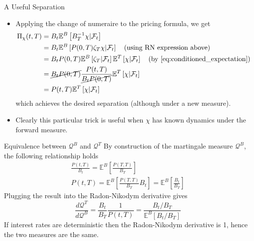 \documentclass{beamer}
\begin{document}
\begin{frame}{A Useful Separation}
	\begin{itemize}
		\item Applying the change of numeraire to the pricing formula, we get
		\begin{equation*}
			\begin{aligned}
			\Pi_\chi(t,T) & = B_t\mathbb{E}^B\left[B^{-1}_T\chi|\mathcal{F}_t\right] \\
			& = B_t\mathbb{E}^B\left[P(0,T)\zeta_T\chi|\mathcal{F}_t\right]\quad\text{(using RN expression above)}\\
			& = B_tP(0,T)\mathbb{E}^B\left[\zeta_T|\mathcal{F}_t\right]\mathbb{E}^T\left[\chi|\mathcal{F}_t\right]\quad\text{(by \cref{eq:conditioned_expectation})}\\
			& = \cancel{B_tP(0,T)}\frac{P(t,T)}{\cancel{B_tP(0,T)}}\mathbb{E}^T\left[\chi|\mathcal{F}_t\right] \\
			& = P(t,T)\mathbb{E}^T\left[\chi|\mathcal{F}_t\right] \\
			\end{aligned}
		\end{equation*}
		which achieves the desired separation (although under a new measure).
		\item Clearly this particular trick is useful when $\chi$ has known dynamics under the forward measure.
	\end{itemize}
\end{frame}

\begin{frame}{Equivalence between $\mathcal{Q}^B$ and $\mathcal{Q}^T$}
By construction of the martingale measure $\mathcal{Q}^B$, the following relationship holds
\begin{equation*}
\begin{gathered}
\frac{P(t,T)}{B_t}=\mathbb{E}^B\left[\frac{P(T,T)}{B_T}\right]\\[0.3cm]
P(t,T)=\mathbb{E}^B\left[\frac{P(T,T)}{B_T}B_t\right] = \mathbb{E}^B\left[\frac{B_t}{B_T}\right]
\end{gathered}
\end{equation*}
Plugging the result into the Radon-Nikodym derivative gives
\begin{equation*}
	\frac{d\mathcal{Q}^T}{d\mathcal{Q}^B} = \frac{B_t}{B_T}\frac{1}{P(t,T)} =\frac{B_t/B_T}{\mathbb{E}^B[B_t/B_T]}
\end{equation*}	
If interest rates are deterministic then the Radon-Nikodym derivative is 1, hence the two measures are the same.
\end{frame}
\end{document}
